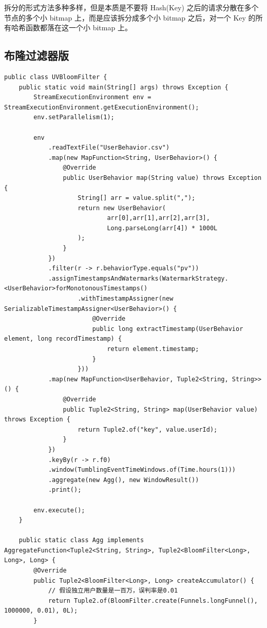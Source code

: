\documentclass[cn,11pt,chinese]{elegantbook}
\begin{document}
拆分的形式方法多种多样，但是本质是不要将 Hash(Key) 之后的请求分散在多个节点的多个小 bitmap 上，而是应该拆分成多个小 bitmap 之后，对一个 Key 的所有哈希函数都落在这一个小 bitmap 上。

\subsection{布隆过滤器版}

\begin{verbatim}
public class UVBloomFilter {
    public static void main(String[] args) throws Exception {
        StreamExecutionEnvironment env = StreamExecutionEnvironment.getExecutionEnvironment();
        env.setParallelism(1);

        env
            .readTextFile("UserBehavior.csv")
            .map(new MapFunction<String, UserBehavior>() {
                @Override
                public UserBehavior map(String value) throws Exception {
                    String[] arr = value.split(",");
                    return new UserBehavior(
                            arr[0],arr[1],arr[2],arr[3],
                            Long.parseLong(arr[4]) * 1000L
                    );
                }
            })
            .filter(r -> r.behaviorType.equals("pv"))
            .assignTimestampsAndWatermarks(WatermarkStrategy.<UserBehavior>forMonotonousTimestamps()
                    .withTimestampAssigner(new SerializableTimestampAssigner<UserBehavior>() {
                        @Override
                        public long extractTimestamp(UserBehavior element, long recordTimestamp) {
                            return element.timestamp;
                        }
                    }))
            .map(new MapFunction<UserBehavior, Tuple2<String, String>>() {
                @Override
                public Tuple2<String, String> map(UserBehavior value) throws Exception {
                    return Tuple2.of("key", value.userId);
                }
            })
            .keyBy(r -> r.f0)
            .window(TumblingEventTimeWindows.of(Time.hours(1)))
            .aggregate(new Agg(), new WindowResult())
            .print();

        env.execute();
    }

    public static class Agg implements AggregateFunction<Tuple2<String, String>, Tuple2<BloomFilter<Long>, Long>, Long> {
        @Override
        public Tuple2<BloomFilter<Long>, Long> createAccumulator() {
            // 假设独立用户数量是一百万，误判率是0.01
            return Tuple2.of(BloomFilter.create(Funnels.longFunnel(), 1000000, 0.01), 0L);
        }


\end{verbatim}
\end{document}
